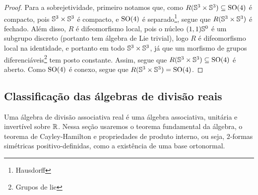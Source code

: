 \begin{proof}
Para a sobrejetividade, primeiro notamos que, como $R(\S^3 \times \S^3) \subseteq \SO(4)$ é compacto, pois $\S^3 \times \S^3$ é compacto, e $\SO(4)$ é separado\footnote{Hausdorff}, segue que $R(\S^3 \times \S^3)$ é fechado. Além disso, $R$ é difeomorfismo local, pois o núcleo $(1,1)\S^0$ é um subgrupo discreto (portanto tem álgebra de Lie trivial), logo $R$ é difeomorfismo local na identidade, e portanto em todo $\S^3 \times \S^3$, já que um morfismo de grupos diferenciáveis\footnote{Grupos de lie} tem posto constante. Assim, segue que $R(\S^3 \times \S^3) \subseteq \SO(4)$ é aberto. Como $\SO(4)$ é conexo, segue que $R(\S^3 \times \S^3) = \SO(4)$.
\end{proof}



\begin{comment}

Lembremos que, pela decomposição polar, todo $u \in \S^3$ pode ser escrito como
	\begin{equation*}
	u = \cos(\phi) + \sin(\phi)\hat{u} = \e^{\phi \hat{u}},
	\end{equation*}
com $\phi = \cos(\esc{u}) \in \intff{0}{\tau \div 2}$ e $\hat{u} = \frac{\vec{u}}{\nor{\hat{u}}} \in \vec{\S}^2$.





Definimos a função
	\begin{align*}
	\func{R}{\S^3 \times \S^3}{\SO(3)}{(u,u')}{
		\begin{aligned}[t]
		\func{R^{2\phi}_{\hat{u}}}{\vec{\R}^3}{\vec{\R}^3}{x}{\e^{\phi \hat{u}}x\e^{-\phi \hat{u}}}
		\end{aligned}
	}
	\end{align*}

\end{comment}




\subsection{Classificação das álgebras de divisão reais}

Uma álgebra de divisão associativa real é uma álgebra associativa, unitária e invertível sobre $\R$. Nessa seção usaremos o teorema fundamental da álgebra, o teorema de Cayley-Hamilton e propriedades de produto interno, ou seja, $2$-formas simétricas positivo-definidas, como a existência de uma base ortonormal.

